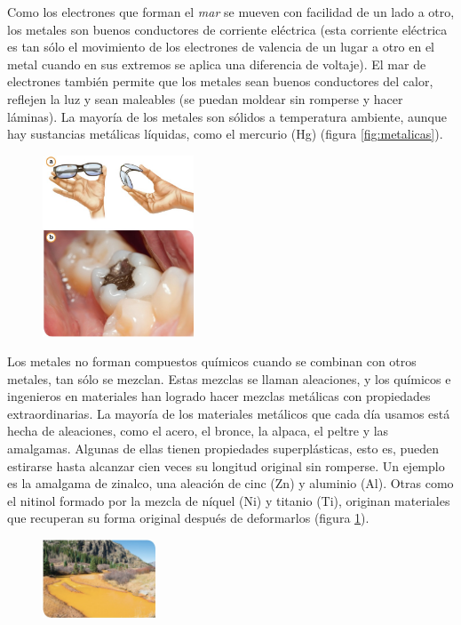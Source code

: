 \documentclass[11pt]{book}
\begin{document}
Como los electrones que forman el \emph{mar} se mueven con facilidad de un lado a otro, los metales
son buenos conductores de corriente eléctrica (esta corriente eléctrica es tan sólo el movimiento de
los electrones de valencia de un lugar a otro en el metal cuando en sus extremos se aplica una
diferencia de voltaje). El mar de electrones también permite que los metales sean buenos conductores
del calor, reflejen la luz y sean maleables (se puedan moldear sin romperse y hacer láminas).
La mayoría de los metales son sólidos a temperatura ambiente, aunque hay sustancias metálicas
líquidas, como el mercurio (Hg) (figura \ref{fig:metalicas}).

\begin{figure}
  \centering
  \includegraphics[width=0.4\textwidth]{metalicas2.jpg}
  \label{fig:metalicas2}
\end{figure}

Los metales no forman compuestos químicos cuando se combinan con otros metales, tan sólo se mezclan.
Estas mezclas se llaman aleaciones, y los químicos e ingenieros en materiales han logrado
hacer mezclas metálicas con propiedades extraordinarias. La mayoría de los materiales metálicos
que cada día usamos está hecha de aleaciones, como el acero, el bronce, la alpaca, el peltre y
las amalgamas. Algunas de ellas tienen propiedades superplásticas, esto es, pueden estirarse
hasta alcanzar cien veces su longitud original sin romperse. Un ejemplo es la amalgama de zinalco,
una aleación de cinc (Zn) y aluminio (Al). Otras como el nitinol formado por la mezcla de níquel (Ni)
y titanio (Ti), originan materiales que recuperan su forma original después de deformarlos (figura \ref{fig:metalicas2}).

\begin{figure}
  \centering
  \includegraphics[width=0.3\textwidth]{metalicas3.jpg}
  \label{fig:metalicas3}
\end{figure}
\end{document}

